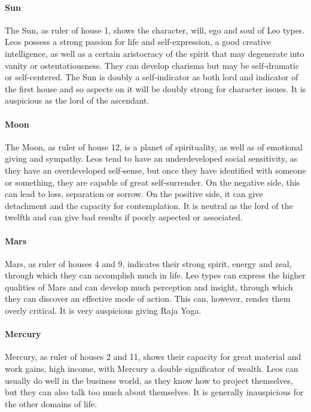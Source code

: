 \paragraph{Sun}

The Sun, as ruler of house 1, shows the character, will, ego and soul of Leo types. Leos possess a strong passion for life and self‑expression, a good creative intelligence, as well as a certain aristocracy of the spirit that may degenerate into vanity or ostentatiousness. They can develop charisma but may be self‑dramatic or self‑centered. The Sun is doubly a self‑indicator as both lord and indicator of the first house and so aspects on it will be doubly strong for character issues. It is auspicious as the lord of the ascendant.

 

\paragraph{Moon}

The Moon, as ruler of house 12, is a planet of spirituality, as well as of emotional giving and sympathy. Leos tend to have an underdeveloped social sensitivity, as they have an overdeveloped self‑sense, but once they have identified with someone or something, they are capable of great self‑surrender. On the negative side, this can lead to loss, separation or sorrow. On the positive side, it can give detachment and the capacity for contemplation. It is neutral as the lord of the twelfth and can give bad results if poorly aspected or associated.

 

\paragraph{Mars}

Mars, as ruler of houses 4 and 9, indicates their strong spirit, energy and zeal, through which they can accomplish much in life. Leo types can express the higher qualities of Mars and can develop much perception and insight, through which they can discover an effective mode of action. This can, however, render them overly critical. It is very auspicious giving Raja Yoga.

 

\paragraph{Mercury}

Mercury, as ruler of houses 2 and 11, shows their capacity for great material and work gains, high income, with Mercury a double significator of wealth. Leos can usually do well in the business world, as they know how to project themselves, but they can also talk too much about themselves. It is generally inauspicious for the other domains of life.

